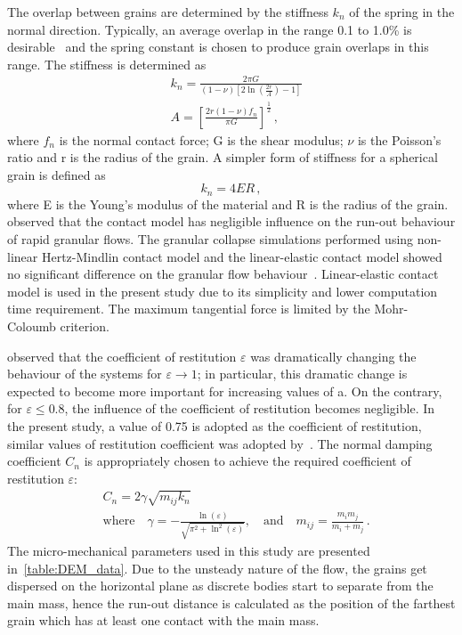The overlap between grains are determined by the stiffness 
$\textit{k}_{\textit{n}}$ of the spring in the normal direction. Typically, 
an average overlap in the range 0.1 to 1.0\% is desirable~\cite{Zenit2005} and 
the spring constant is chosen to produce grain overlaps in this range. The 
stiffness is determined as
\begin{align}
& \textit{k}_{\textit{n}}=\frac{2 \pi G}{(1-\nu)[2\ln(\frac{2r}{A})-1]} \\ 
& A = [\frac{2r(1-\nu)f_{n}}{\pi G}]^{\frac{1	}{2}}\,,
\end{align}
where $f_{n}$ is the normal contact force; G is the shear modulus; $\nu$ is the 
Poisson's ratio and r is the radius of the grain. A simpler form of stiffness 
for a spherical grain is defined as
\begin{equation}
\textit{k}_{\textit{n}}=4ER\,,
\end{equation}
where E is the Young's modulus of the material and R is the radius of the 
grain.~\citet{Cambou2009} observed that the contact model has negligible 
influence on the run-out behaviour of rapid granular flows. The granular 
collapse simulations performed using non-linear Hertz-Mindlin contact model and 
the linear-elastic contact model showed no significant difference on the 
granular flow behaviour~\citet{Utili2014}. Linear-elastic contact model is used 
in the present study due to its simplicity and lower computation time 
requirement. The maximum tangential force is limited by the Mohr-Coloumb 
criterion. 


\citet{Staron2006a} observed that the coefficient of restitution $\varepsilon$ 
was dramatically changing the behaviour of the systems for 
$\varepsilon\longrightarrow 1$; in particular, this dramatic change is expected 
to become more important for increasing values of a. On the contrary, for 
$\varepsilon \le 0.8$, the influence of the coefficient of restitution becomes 
negligible. In the present study, a value of 0.75 is adopted as the coefficient 
of restitution, similar values of restitution coefficient was adopted 
by~\citet{Zenit2005,Girolami}. The normal damping coefficient 
$C_{\textit{n}}$ 
is appropriately chosen to achieve the required coefficient of restitution 
$\varepsilon$:
\begin{align}
& C_{\textit{n}}=2\gamma \sqrt{m_{\textit{ij}}k_{\textit{n}}} \\ 
& \mbox{where} \quad \gamma = -\frac{\ln(\varepsilon)}{\sqrt{\pi^{2}+\ln^2 
(\varepsilon)}},\quad \mbox{and} \quad 
\textit{m}_{\textit{ij}}=\frac{\textit{m}_{\textit{i}}\textit{m}_{\textit{j}}}{\textit{m}_{\textit{i}}
 + \textit{m}_{\textit{j}}} \,.
\end{align}
%
The micro-mechanical parameters used in this study are presented 
in~\cref{table:DEM_data}. Due to the unsteady nature of the flow, the 
grains get dispersed on the horizontal plane as discrete bodies start to 
separate from the main mass, hence the run-out distance is calculated as the 
position of the farthest grain which has at least one contact with the main 
mass.


